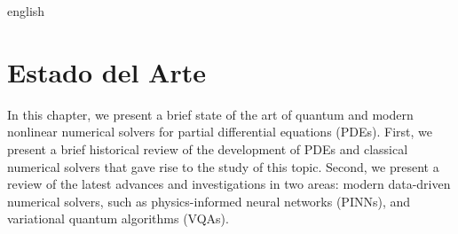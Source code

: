 
\begin{hyphenrules}{english}

\chapter{Estado del Arte}\label{ch:EstadoDelArte}

In this chapter, we present a brief state of the art of quantum and modern nonlinear numerical solvers for partial differential equations (PDEs). 
First, we present a brief historical review of the development of PDEs and classical numerical solvers that gave rise to the study of this topic. Second, 
we present a review of the latest advances and investigations in two areas: modern data-driven numerical solvers, such as physics-informed neural networks (PINNs), and 
variational quantum algorithms (VQAs).

\end{hyphenrules}
